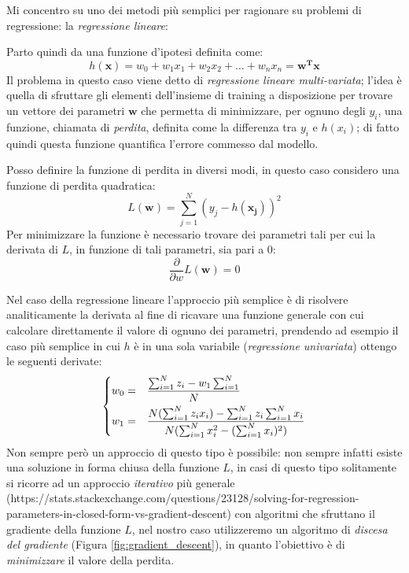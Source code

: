 \documentclass[../../main.tex]{subfiles}
\begin{document}
    Mi concentro su uno dei metodi più semplici per ragionare su problemi di regressione: la \textit{regressione lineare}:
    
    Parto quindi da una funzione d'ipotesi definita come:
    \[h(\boldsymbol{x}) = w_0 + w_1x_1 + w_2x_2 + \dots + w_nx_n = \boldsymbol{w^T x}\]
    Il problema in questo caso viene detto di \textit{regressione lineare multi-variata}; l'idea è quella di sfruttare gli elementi dell'insieme di training a disposizione per trovare un vettore dei parametri $\boldsymbol{w}$ che permetta di minimizzare, per ognuno degli $y_i$, una funzione, chiamata di \textit{perdita}, definita come la differenza tra $y_i$ e $h(x_i)$; di fatto quindi questa funzione quantifica l'errore commesso dal modello.
    
    Posso definire la funzione di perdita in diversi modi, in questo caso considero una funzione di perdita quadratica:
    \[L(\boldsymbol{w}) = \sum_{j=1}^N(y_j - h(\boldsymbol{x_j}))^2\]
    Per minimizzare la funzione è necessario trovare dei parametri tali per cui la derivata di $L$, in funzione di tali parametri, sia pari a 0:
    \[\frac{\partial}{\partial w} L(\boldsymbol{w}) = 0\]

    Nel caso della regressione lineare l'approccio più semplice è di risolvere analiticamente la derivata al fine di ricavare una funzione generale con cui calcolare direttamente il valore di ognuno dei parametri, prendendo ad esempio il caso più semplice in cui $h$ è in una sola variabile (\textit{regressione univariata}) ottengo le seguenti derivate:
    \[
    \begin{dcases}
        w_0 = & \frac{\sum_{i=1}^N z_i - w_1 \sum_{i=1}^N}{N}\\
        w_1 = & \frac{N(\sum_{i=1}^N z_ix_i) - \sum_{i=1}^N z_i \sum_{i=1}^N x_i}{N(\sum_{i=1}^N x_i^2 - (\sum_{i=1}^N x_i)^2)} 
    \end{dcases}    
    \]
    Non sempre però un approccio di questo tipo è possibile: non sempre infatti esiste una soluzione in forma chiusa della funzione $L$, in casi di questo tipo solitamente si ricorre ad un approccio \textit{iterativo} più generale (https://stats.stackexchange.com/questions/23128/solving-for-regression-parameters-in-closed-form-vs-gradient-descent) con algoritmi che sfruttano il gradiente della funzione $L$, nel nostro caso utilizzeremo un algoritmo di \textit{discesa del gradiente} (Figura \ref{fig:gradient_descent}), in quanto l'obiettivo è di \textit{minimizzare} il valore della perdita.
\end{document}
